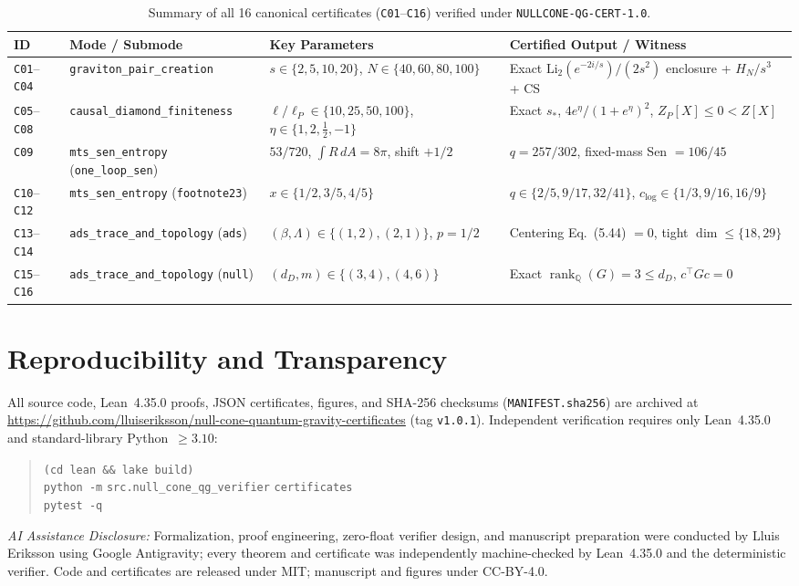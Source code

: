 \documentclass[10pt,twocolumn]{article}
\begin{document}
\begin{table}[tb]
\centering
\caption{Summary of all 16 canonical certificates (\texttt{C01}--\texttt{C16}) verified under \texttt{NULLCONE-QG-CERT-1.0}.}
\label{tab:certs}
\scriptsize
\setlength{\tabcolsep}{4.5pt}
\begin{tabular}{@{}llll@{}}
\toprule
ID & Mode / Submode & Key Parameters & Certified Output / Witness \\
\midrule
\texttt{C01}--\texttt{C04} & \texttt{graviton\_pair\_creation} & $s \in \{2,5,10,20\}$, $N \in \{40,60,80,100\}$ & Exact $\mathrm{Li}_2(e^{-2i/s})/(2s^2)$ enclosure + $H_N/s^3$ + CS \\
\texttt{C05}--\texttt{C08} & \texttt{causal\_diamond\_finiteness} & $\ell/\ell_P \in \{10,25,50,100\}$, $\eta \in \{1,2,\frac{1}{2},-1\}$ & Exact $s_*$, $4e^\eta/(1+e^\eta)^2$, $Z_P[X]\leq 0 < Z[X]$ \\
\texttt{C09} & \texttt{mts\_sen\_entropy} (\texttt{one\_loop\_sen}) & $53/720$, $\int R\,dA = 8\pi$, shift $+1/2$ & $q = 257/302$, fixed-mass Sen $= 106/45$ \\
\texttt{C10}--\texttt{C12} & \texttt{mts\_sen\_entropy} (\texttt{footnote23}) & $x \in \{1/2, 3/5, 4/5\}$ & $q \in \{2/5, 9/17, 32/41\}$, $c_{\log} \in \{1/3, 9/16, 16/9\}$ \\
\texttt{C13}--\texttt{C14} & \texttt{ads\_trace\_and\_topology} (\texttt{ads}) & $(\beta,\Lambda) \in \{(1,2),(2,1)\}$, $p=1/2$ & Centering Eq.~(5.44) $=0$, tight $\dim \leq \{18, 29\}$ \\
\texttt{C15}--\texttt{C16} & \texttt{ads\_trace\_and\_topology} (\texttt{null}) & $(d_D, m) \in \{(3,4),(4,6)\}$ & Exact $\operatorname{rank}_{\mathbb{Q}}(G) = 3 \leq d_D$, $c^\top G c = 0$ \\
\bottomrule
\end{tabular}
\end{table}

\section{Reproducibility and Transparency}
All source code, Lean~4.35.0 proofs, JSON certificates, figures, and SHA-256 checksums (\texttt{MANIFEST.sha256}) are archived at \url{https://github.com/lluiseriksson/null-cone-quantum-gravity-certificates} (tag \texttt{v1.0.1}). Independent verification requires only Lean~4.35.0 and standard-library Python~$\geq 3.10$:
\begin{quote}\small\raggedright
\texttt{(cd lean \&\& lake build)}\\
\texttt{python -m} \nolinkurl{src.null_cone_qg_verifier} \texttt{certificates}\\
\texttt{pytest -q}
\end{quote}
\noindent\textit{AI Assistance Disclosure:} Formalization, proof engineering, zero-float verifier design, and manuscript preparation were conducted by Lluis Eriksson using Google Antigravity; every theorem and certificate was independently machine-checked by Lean~4.35.0 and the deterministic verifier. Code and certificates are released under MIT; manuscript and figures under CC-BY-4.0.
\end{document}
